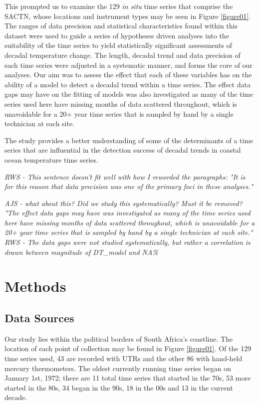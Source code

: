 \documentclass{ametsoc}
\begin{document}
This prompted us to examine the 129 \emph{in situ} time series that comprise the SACTN, whose locations and instrument types may be seen in Figure \ref{figure01}. The ranges of data precision and statistical characteristics found within this dataset were used to guide a series of hypotheses driven analyses into the suitability of the time series to yield statistically significant assessments of decadal temperature change. The length, decadal trend and data precision of each time series were adjusted in a systematic manner, and forms the core of our analyses. Our aim was to assess the effect that each of these variables has on the ability of a model to detect a decadal trend within a time series. The effect data gaps may have on the fitting of models was also investigated as many of the time series used here have missing months of data scattered throughout, which is unavoidable for a 20+ year time series that is sampled by hand by a single technician at each site.

The study provides a better understanding of some of the determinants of a time series that are influential in the detection success of decadal trends in coastal ocean temperature time series.

\emph{RWS - This sentence doesn't fit well with how I reworded the paragraphs: "It is for this reason that data precision was one of the primary foci in these analyses."}

\emph{AJS - what about this? Did we study this systematically? Must it be removed? "The effect data gaps may have was investigated as many of the time series used here have missing months of data scattered throughout, which is unavoidable for a 20+ year time series that is sampled by hand by a single technician at each site."}
\emph{RWS - The data gaps were not studied systematically, but rather a correlation is drawn between magnitude of DT_model and NA\%}

\section{Methods}

\subsection{Data Sources}
Our study lies within the political borders of South Africa's coastline. The location of each point of collection may be found in Figure \ref{figure01}. Of the 129 time series used, 43 are recorded with UTRs and the other 86 with hand-held mercury thermometers. The oldest currently running time series began on January 1st, 1972; there are 11 total time series that started in the 70s, 53 more started in the 80s, 34 began in the 90s, 18 in the 00s and 13 in the current decade.
\end{document}
